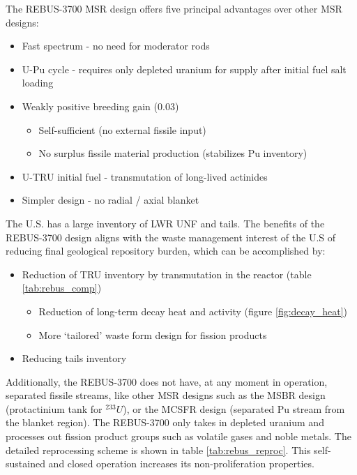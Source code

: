 The REBUS-3700 \gls{MSR} design offers five principal
advantages over other \gls{MSR} designs:
\begin{itemize}
	\item Fast spectrum - no need for moderator rods 
	\item U-Pu cycle - requires only depleted uranium for supply after initial fuel salt loading
	\item Weakly positive breeding gain (0.03)
	\begin{itemize}
		\item Self-sufficient (no external fissile input)
		\item No surplus fissile material production (stabilizes Pu inventory)
	\end{itemize}
	\item U-\gls{TRU} initial fuel - transmutation of long-lived actinides
	\item Simpler design - no radial / axial blanket
\end{itemize}

The U.S. has a large inventory of \gls{LWR} \gls{UNF} and tails. The benefits
of the REBUS-3700 design aligns with the waste management interest
of the U.S of reducing final geological repository burden, which can be 
accomplished by:

\begin{itemize}
	\item Reduction of \gls{TRU} inventory by transmutation in the reactor (table \ref{tab:rebus_comp})
	\begin{itemize}
		\item Reduction of long-term decay heat and activity (figure \ref{fig:decay_heat})
		\item More `tailored' waste form design for fission products
	\end{itemize}
	\item Reducing tails inventory
\end{itemize}

Additionally, the REBUS-3700 does not have, at any moment in
operation, separated fissile streams, like other \gls{MSR} designs
such as the \gls{MSBR} design \cite{robertson_conceptual_1971} (protactinium tank for
$^{233}U$),
or the \gls{MCSFR} design \cite{smith_assessment_1974} (separated Pu stream from the blanket region).
The REBUS-3700 only takes in depleted uranium and processes out
fission product groups such as volatile gases and noble metals.
The detailed reprocessing scheme is shown
in table \ref{tab:rebus_reproc}. 
This self-sustained and closed operation increases its non-proliferation
properties.

